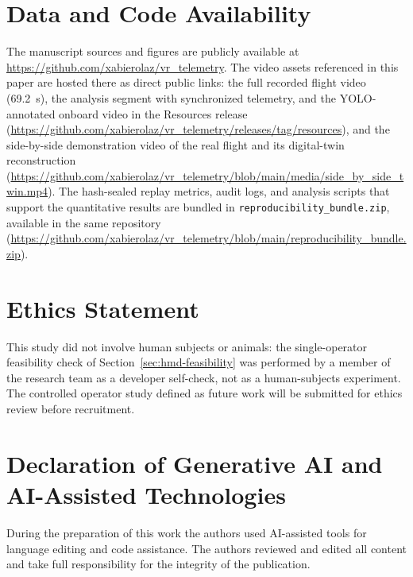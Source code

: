 \documentclass[fleqn]{VRIH2025}
\newcommand{\code}[1]{\texttt{#1}}
\begin{document}
\section*{Data and Code Availability}
The manuscript sources and figures are publicly available at \url{https://github.com/xabierolaz/vr_telemetry}. The video assets referenced in this paper are hosted there as direct public links: the full recorded flight video (69.2~s), the analysis segment with synchronized telemetry, and the YOLO-annotated onboard video in the Resources release (\url{https://github.com/xabierolaz/vr_telemetry/releases/tag/resources}), and the side-by-side demonstration video of the real flight and its digital-twin reconstruction (\url{https://github.com/xabierolaz/vr_telemetry/blob/main/media/side_by_side_twin.mp4}). The hash-sealed replay metrics, audit logs, and analysis scripts that support the quantitative results are bundled in \code{reproducibility\_bundle.zip}, available in the same repository (\url{https://github.com/xabierolaz/vr_telemetry/blob/main/reproducibility_bundle.zip}).

\section*{Ethics Statement}
This study did not involve human subjects or animals: the single-operator feasibility check of Section~\ref{sec:hmd-feasibility} was performed by a member of the research team as a developer self-check, not as a human-subjects experiment. The controlled operator study defined as future work will be submitted for ethics review before recruitment.

\section*{Declaration of Generative AI and AI-Assisted Technologies}
During the preparation of this work the authors used AI-assisted tools for language editing and code assistance. The authors reviewed and edited all content and take full responsibility for the integrity of the publication.


\end{document}

